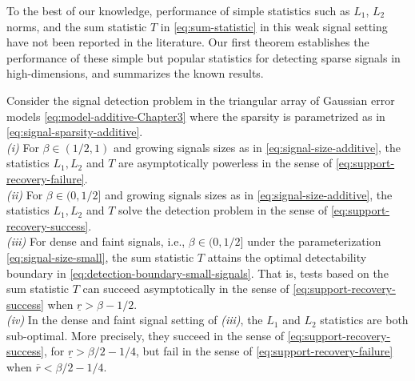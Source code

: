 To the best of our knowledge, performance of simple statistics such as $L_1$, $L_2$ norms, and 
the sum statistic $T$ in \eqref{eq:sum-statistic} in this weak signal setting have not been reported in the literature. %
Our first theorem establishes the performance of these simple but popular statistics for detecting sparse signals 
in high-dimensions, and summarizes the known results.

\begin{theorem} \label{thm:detection-optimality}
Consider the signal detection problem in the triangular array of Gaussian error models \eqref{eq:model-additive-Chapter3} where the sparsity is parametrized as in \eqref{eq:signal-sparsity-additive}.\\

{\em (i)}  For $\beta \in (1/2,1)$ and growing signals sizes as in \eqref{eq:signal-size-additive}, the statistics
    $L_1, L_2$ and $T$ are asymptotically powerless in the sense of \eqref{eq:support-recovery-failure}.\\
    
{\em (ii)} For $\beta \in (0,1/2]$ and growing signals sizes as in \eqref{eq:signal-size-additive}, the statistics
    $L_1, L_2$ and $T$ solve the detection problem in the sense of \eqref{eq:support-recovery-success}.\\
    
{\em (iii)} For dense and faint signals, i.e., $\beta \in (0,1/2]$ under the parameterization \eqref{eq:signal-size-small}, the sum statistic $T$
    attains the optimal detectability boundary in \eqref{eq:detection-boundary-small-signals}.  That is, tests based on the sum statistic $T$ can 
    succeed asymptotically in the sense of \eqref{eq:support-recovery-success} when $\underline{r}>\beta-1/2$.\\
     
 {\em (iv)} In the dense and faint signal setting of {\em (iii)}, the $L_1$ and $L_2$ statistics are both 
 sub-optimal. More precisely, they succeed in the sense of  \eqref{eq:support-recovery-success},  for $\underline{r}>\beta/2-{1}/{4}$, but fail in the 
 sense of \eqref{eq:support-recovery-failure} when $\overline{r}<\beta/2-{1}/{4}$.
\end{theorem}


